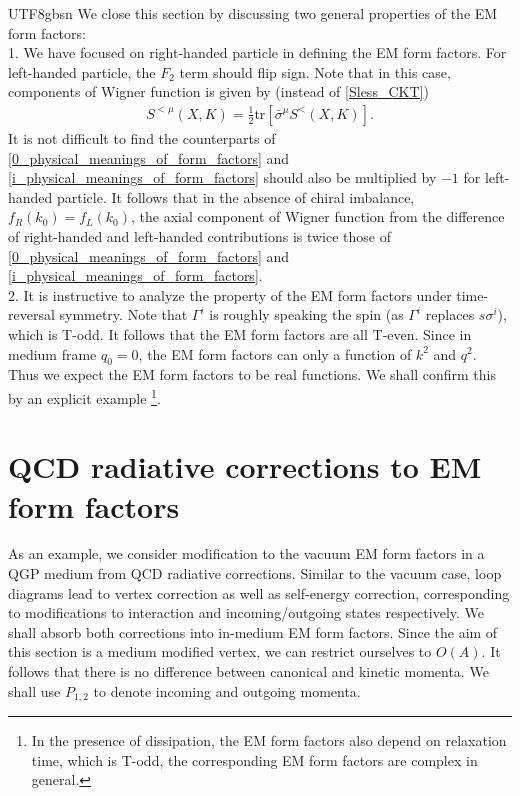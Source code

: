 \documentclass[11pt]{article}\def\baselinestretch{1.4}
\def\e{{\epsilon}}
\def\G{{\Gamma}}
\def\m{{\mu}}
\def\n{{\nu}}
\def\r{{\rho}}
\def\s{{\sigma}}
\newcommand{\tr}{\text{tr}}
\begin{document}
\begin{CJK}{UTF8}{gbsn}
We close this section by discussing two general properties of the EM form factors:\\
1. We have focused on right-handed particle in defining the EM form factors. For left-handed particle, the $F_2$ term should flip sign. %
Note that in this case, components of Wigner function is given by (instead of \eqref{Sless_CKT})
\begin{align}
S^{<\m}(X,K)=\frac{1}{2}\tr[\bar{\s}^\m S^<(X,K)].
\end{align}
It is not difficult to find the counterparts of \eqref{0_physical_meanings_of_form_factors} and \eqref{i_physical_meanings_of_form_factors} should also be multiplied by $-1$ for left-handed particle. It follows that in the absence of chiral imbalance, $f_R(k_0)=f_L(k_0)$, the axial component of Wigner function from the difference of right-handed and left-handed contributions is twice those of \eqref{0_physical_meanings_of_form_factors} and \eqref{i_physical_meanings_of_form_factors}.
\\
2. It is instructive to analyze the property of the EM form factors under time-reversal symmetry. Note that $\G^i$ is roughly speaking the spin (as $\G^i$ replaces $s\s^i$), which is T-odd. It follows that the EM form factors are all T-even. Since in medium frame $q_0=0$, the EM form factors can only a function of $k^2$ and $q^2$. Thus we expect the EM form factors to be real functions. We shall confirm this by an explicit example \footnote{In the presence of dissipation, the EM form factors also depend on relaxation time, which is T-odd, the corresponding EM form factors are complex in general.}.

\section{QCD radiative corrections to EM form factors}\label{sec_4}

As an example, we consider modification to the vacuum EM form factors in a QGP medium from QCD radiative corrections. Similar to the vacuum case, loop diagrams lead to vertex correction as well as self-energy correction, corresponding to modifications to interaction and incoming/outgoing states respectively. We shall absorb both corrections into in-medium EM form factors. Since the aim of this section is a medium modified vertex, we can restrict ourselves to $O(A)$. It follows that there is no difference between canonical and kinetic momenta. We shall use $P_{1,2}$ to denote incoming and outgoing momenta.
%


\end{CJK}
\end{document}
